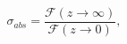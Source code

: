 \begin{equation}
\sigma _{abs}=\frac{\mathcal{F}\left( z\rightarrow \infty \right) }{\mathcal{ F}\left( z\rightarrow
0\right) }
\label{sigma},
\end{equation}

